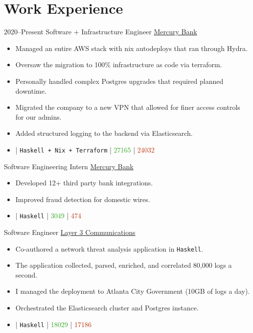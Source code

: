 \documentclass[10pt,letterpaper,sans]{moderncv}
\newcommand{\wlink}[2]{\textcolor[HTML]{0020B6}{\href{#1}{#2}}}
\newcommand{\lang}[1]{\texttt{#1}}
\newcommand{\ghlink}[2]{\wlink{https://github.com/#1}{#2}}
\newcommand{\ghrepo}[1]{\ghlink{#1}{\faGithub}}
\newcommand{\ghlang}[1]{\texttt{#1}}
\newcommand{\ghadd}[1]{\textcolor[HTML]{30A622}{{\faPlusCircle} #1}}
\newcommand{\ghrem}[1]{\textcolor[HTML]{BD2C00}{{\faMinusCircle} #1}}
\newcommand{\ghub}[4]{\ghrepo{#2} | \ghlang{#1} | \ghadd{#3} | \ghrem{#4}}
\begin{document}
\makecvtitle{}

\section{Work Experience}

\cventry
{2020--Present}
{Software + Infrastructure Engineer}
{\wlink{https://mercury.co/}{Mercury Bank}}
{}{}
{
  \begin{itemize}         
  \item Managed an entire AWS stack with nix autodeploys that ran through Hydra.
  \item Oversaw the migration to 100\% infrastructure as code via terraform.
  \item Personally handled complex Postgres upgrades that required planned downtime.
  \item Migrated the company to a new VPN that allowed for finer access controls
    for our admins.
  \item Added structured logging to the backend via Elasticsearch.
  \item \ghub{Haskell + Nix + Terraform}{mercury-technologies}{27165}{24032}
  \end{itemize}
}


        {Software Engineering Intern}
        {\wlink{https://mercury.co/}{Mercury Bank}}
        {}{}
        {
\begin{itemize}         
\item Developed 12+ third party bank integrations.
\item Improved fraud detection for domestic wires.
\item \ghub{Haskell}{mercury-technologies}{3049}{474}
\end{itemize}
}

        {Software Engineer}
        {\wlink{http://layer3com.com/}{Layer 3 Communications}}
        {}{}
        {
\begin{itemize}
\item Co-authored a network threat analysis application in \lang{Haskell}.
\item The application collected, parsed, enriched, and correlated 80,000 logs
  a second.
\item I managed the deployment to Atlanta City Government (10GB of logs a day).
\item Orchestrated the Elasticsearch cluster and Postgres instance.
\item \ghub{Haskell}{layer-3-communications}{18029}{17186}
\end{itemize}
}
\end{document}
